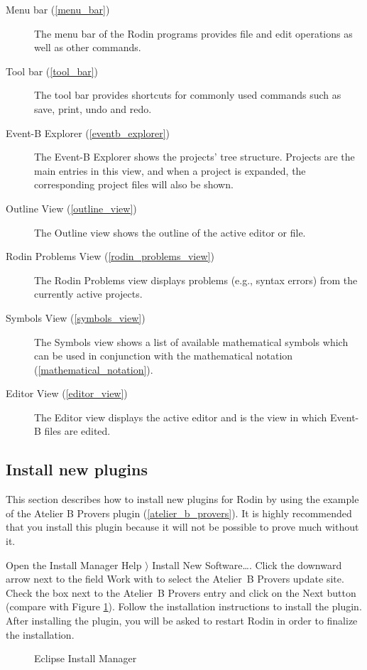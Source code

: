 \begin{description}
	\item[Menu bar (\ref{menu_bar})] The menu bar of the Rodin programs provides file and edit operations as well as other commands.
	\item[Tool bar (\ref{tool_bar})] The tool bar provides shortcuts for commonly used commands such as save, print, undo and redo.
	\item[Event-B Explorer (\ref{eventb_explorer})] The Event-B Explorer shows the projects' tree structure. Projects are the main entries in this view, and when a project is expanded, the corresponding project files will also be shown.
	\item[Outline View (\ref{outline_view})] The Outline view shows the outline of the active editor or file.
	\item[Rodin Problems View (\ref{rodin_problems_view})] The Rodin Problems view displays problems (e.g., syntax errors) from the currently active projects.
	\item[Symbols View (\ref{symbols_view})] The Symbols view shows a list of available mathematical symbols which can be used in conjunction with the mathematical notation (\ref{mathematical_notation}).
	\item[Editor View (\ref{editor_view})] The Editor view displays the active editor and is the view in which Event-B files are edited.
\end{description}

\subsection{Install new plugins}
\label{tut_install_plugins}

This section describes how to install new plugins for Rodin by using the example of the Atelier B Provers plugin (\ref{atelier_b_provers}). It is highly recommended that you install this plugin because it will not be possible to prove much without it.

Open the Install Manager \textsf{Help $\rangle$ Install New Software\ldots}. Click the downward arrow next to the field \textsf{Work with} to select the Atelier~B Provers update site. Check the box next to the Atelier~B Provers entry and click on the \textsf{Next} button (compare with Figure \ref{fig_tut_02_install_manager}). Follow the installation instructions to install the plugin. After installing the plugin, you will be asked to restart Rodin in order to finalize the installation.


\begin{figure}[!ht]
\begin{center}
	\caption{Eclipse Install Manager}
	\label{fig_tut_02_install_manager}
\end{center}
\end{figure}


